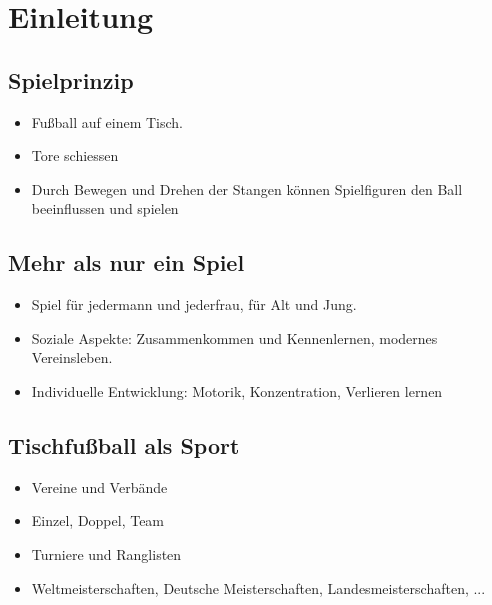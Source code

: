 \chapter{Einleitung}

\section{Spielprinzip}

\begin{itemize}
\item Fußball auf einem Tisch.
\item Tore schiessen
\item Durch Bewegen und Drehen der Stangen können Spielfiguren den Ball beeinflussen und spielen
\end{itemize}

\section{Mehr als nur ein Spiel}

\begin{itemize}
\item Spiel für jedermann und jederfrau, für Alt und Jung. 
\item Soziale Aspekte: Zusammenkommen und Kennenlernen, modernes Vereinsleben.
\item Individuelle Entwicklung: Motorik, Konzentration, Verlieren lernen
\end{itemize}

\section{Tischfußball als Sport}

\begin{itemize}
\item Vereine und Verbände
\item Einzel, Doppel, Team
\item Turniere und Ranglisten
\item Weltmeisterschaften, Deutsche Meisterschaften, Landesmeisterschaften, ...
\end{itemize}

